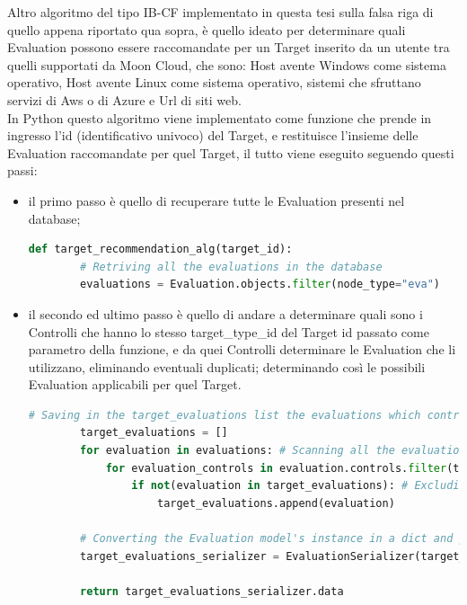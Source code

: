 
Altro algoritmo del tipo IB-CF implementato in questa tesi sulla falsa riga di quello appena riportato qua sopra, è quello ideato per
determinare quali Evaluation possono essere raccomandate per un Target inserito da un utente tra quelli supportati da Moon Cloud,
che sono: Host avente Windows come sistema operativo, Host avente Linux come sistema operativo, sistemi che sfruttano 
servizi di Aws o di Azure e Url di siti web. \\
In Python questo algoritmo viene implementato come funzione che prende in ingresso l'id (identificativo univoco) del Target, e 
restituisce l'insieme delle Evaluation raccomandate per quel Target, il tutto viene eseguito seguendo questi passi:
\begin{itemize}
	\item il primo passo è quello di recuperare tutte le Evaluation presenti nel database;
	\begin{lstlisting}[language=Python, label=lst:IB_CF_Target_1]
	def target_recommendation_alg(target_id):
		# Retriving all the evaluations in the database
		evaluations = Evaluation.objects.filter(node_type="eva")
	\end{lstlisting} 
	\item il secondo ed ultimo passo è quello di andare a determinare quali sono i Controlli che hanno lo stesso target\_type\_id
	del Target id passato come parametro della funzione, e da quei Controlli determinare le Evaluation che li utilizzano, 
	eliminando eventuali duplicati; determinando così le possibili Evaluation applicabili per quel Target.
	\begin{lstlisting}[language=Python, label=lst:IB_CF_Target_2]
		# Saving in the target_evaluations list the evaluations which controls have target_type_id equal to target_id
		target_evaluations = []
		for evaluation in evaluations: # Scanning all the evaluations
			for evaluation_controls in evaluation.controls.filter(target_type_id=target_id):
				if not(evaluation in target_evaluations): # Excluding evaluations duplicated
					target_evaluations.append(evaluation)
	
		# Converting the Evaluation model's instance in a dict and putting the evaluation, as a dict, in a list
		target_evaluations_serializer = EvaluationSerializer(target_evaluations, many=True)

		return target_evaluations_serializer.data
	\end{lstlisting} 
\end{itemize}

